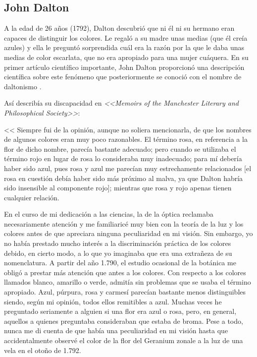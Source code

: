 \documentclass[10pt]{article}
\begin{document}
\subsection{John Dalton}

A la edad de 26 años (1792), Dalton descubrió que ni él ni su hermano eran capaces de distinguir los colores. Le regaló a su madre unas medias (que él creía azules) y ella le preguntó sorprendida cuál era la razón por la que le daba unas medias de color escarlata, que no era apropiado para una mujer cuáquera. En su primer artículo científico importante, John Dalton proporcionó una descripción científica sobre este fenómeno que posteriormente se conoció con el nombre de daltonismo \cite{IEEEreferencias:Ref1}.

\setlength{\parskip}{2mm}

Así describía su discapacidad en \textit{<<Memoirs of the Manchester Literary and Philosophical Society>>}:

<< Siempre fui de la opinión, aunque no soliera mencionarla, de que los nombres de algunos colores eran muy poco razonables. El término rosa, en referencia a la flor de dicho nombre, parecía bastante adecuado; pero cuando se utilizaba el término rojo en lugar de rosa lo consideraba muy inadecuado; para mí debería haber sido azul, pues rosa y azul me parecían muy estrechamente relacionados [el rosa en cuestión debía haber sido más próximo al malva, ya que Dalton habría sido insensible al componente rojo]; mientras que rosa y rojo apenas tienen cualquier relación. 

\setlength{\parskip}{2mm}

En el curso de mi dedicación a las ciencias, la de la óptica reclamaba necesariamente atención y me familiaricé muy bien con la teoría de la luz y los colores antes de que apreciara ninguna peculiaridad en mi visión. Sin embargo, yo no había prestado mucho interés a la discriminación práctica de los colores debido, en cierto modo, a lo que yo imaginaba que era una extrañeza de su nomenclatura. A partir del año 1.790, el estudio ocasional de la botánica me obligó a prestar más atención que antes a los colores. Con respecto a los colores llamados blanco, amarillo o verde, admitía sin problemas que se usaba el término apropiado. Azul, púrpura, rosa y carmesí parecían bastante menos distinguibles siendo, según mi opinión, todos ellos remitibles a azul. Muchas veces he preguntado seriamente a alguien si una flor era azul o rosa, pero, en general, aquellos a quienes preguntaba consideraban que estaba de broma. Pese a todo, nunca me di cuenta de que había una peculiaridad en mi visión hasta que accidentalmente observé el color de la flor del Geranium zonale a la luz de una vela en el otoño de 1.792.
\end{document}
